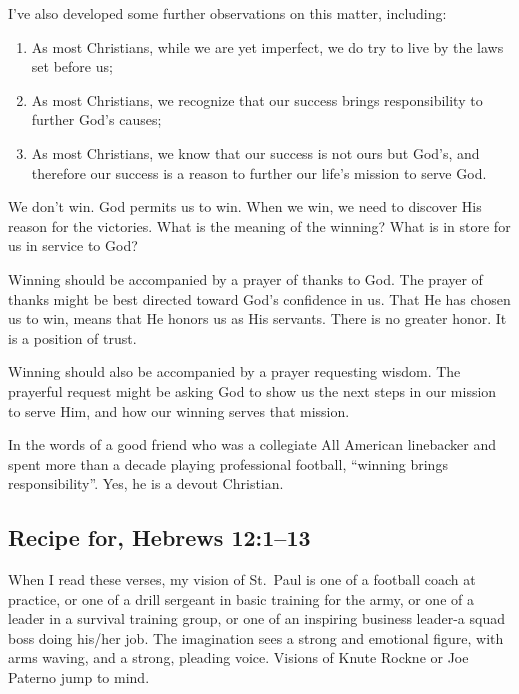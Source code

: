 \documentclass[12pt]{memoir}
\begin{document}
I've also developed some further observations on this matter, including: 
\begin{enumerate}
\item As most Christians, while we are yet imperfect, we do try to live
by the laws set before us; 
\item As most Christians, we recognize that our success brings responsibility
to further God's causes; 
\item As most Christians, we know that our success is not ours but God's,
and therefore our success is a reason to further our life's mission
to serve God. 
\end{enumerate}
We don't win. God permits us to win. When we win, we need to discover
His reason for the victories. What is the meaning of the winning?
What is in store for us in service to God? 

Winning should be accompanied by a prayer of thanks to God. The prayer
of thanks might be best directed toward God's confidence in us. That
He has chosen us to win, means that He honors us as His servants.
There is no greater honor. It is a position of trust. 

Winning should also be accompanied by a prayer requesting wisdom.
The prayerful request might be asking God to show us the next steps
in our mission to serve Him, and how our winning serves that mission. 

In the words of a good friend who was a collegiate All American linebacker
and spent more than a decade playing professional football, ``winning
brings responsibility''. Yes, he is a devout Christian.

\subsection{Recipe for, Hebrews 12:1--13}

When I read these verses, my vision of St.~Paul is one of a football
coach at practice, or one of a drill sergeant in basic training for
the army, or one of a leader in a survival training group, or one
of an inspiring business leader-a squad boss doing his\slash{}her job. The
imagination sees a strong and emotional figure, with arms waving,
and a strong, pleading voice. Visions of Knute Rockne or Joe Paterno
jump to mind.
\end{document}
